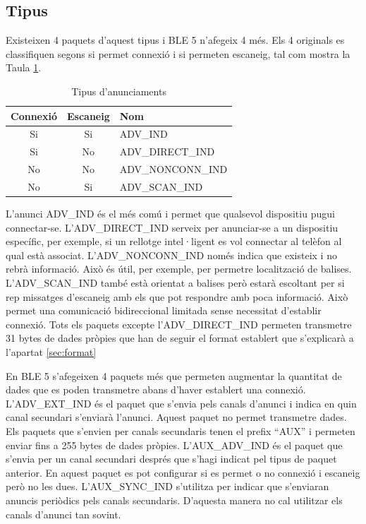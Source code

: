 \subsection{Tipus}
Existeixen 4 paquets d'aquest tipus i BLE 5 n'afegeix 4 més.
Els 4 originals es classifiquen segons si permet connexió i si permeten escaneig, tal com mostra la Taula \ref{tab:Advertisment_Types}.

\begin{table}[!h]
	\begin{center}
		\begin{tabular}{|c|c|l|}
			\hline
			Connexió	&	Escaneig	&	Nom	\\	\hline
			Si			&	Si			&	ADV\_IND	\\	\hline
			Si			&	No			&	ADV\_DIRECT\_IND	\\	\hline
			No			&	No			&	ADV\_NONCONN\_IND	\\	\hline
			No			&	Si			&	ADV\_SCAN\_IND	\\	\hline
		\end{tabular}
	\end{center}
\caption{Tipus d'anunciaments}
\label{tab:Advertisment_Types}
\end{table}


L'anunci ADV\_IND és el més comú i permet que qualsevol dispositiu pugui connectar-se.
L'ADV\_DIRECT\_IND serveix per anunciar-se a un dispositiu específic, per exemple, si un rellotge intel·ligent es vol connectar al telèfon al qual està associat.
L'ADV\_NONCONN\_IND només indica que existeix i no rebrà informació.
Això és útil, per exemple, per permetre localització de balises.
L'ADV\_SCAN\_IND també està orientat a balises però estarà escoltant per si rep missatges d'escaneig amb els que pot respondre amb poca informació.
Això permet una comunicació bidireccional limitada sense necessitat d'establir connexió.
Tots els paquets excepte l'ADV\_DIRECT\_IND permeten transmetre 31 bytes de dades pròpies que han de seguir el format establert que s'explicarà a l'apartat \ref{sec:format}

\label{Advertising_Extension_PDU}
En BLE 5 s'afegeixen 4 paquets més que permeten augmentar la quantitat de dades que es poden transmetre abans d'haver establert una connexió.
L'ADV\_EXT\_IND és el paquet que s'envia pels canals d'anunci i indica en quin canal secundari s'enviarà l'anunci. Aquest paquet no permet transmetre dades.
Els paquets que s'envien per canals secundaris tenen el prefix ``AUX'' i permeten enviar fins a 255 bytes de dades pròpies.
L'AUX\_ADV\_IND és el paquet que s'envia per un canal secundari després que s'hagi indicat pel tipus de paquet anterior.
En aquest paquet es pot configurar si es permet o no connexió i escaneig però no les dues.
L'AUX\_SYNC\_IND s'utilitza per indicar que s'enviaran anuncis periòdics pels canals secundaris.
D'aquesta manera no cal utilitzar els canals d'anunci tan sovint.

